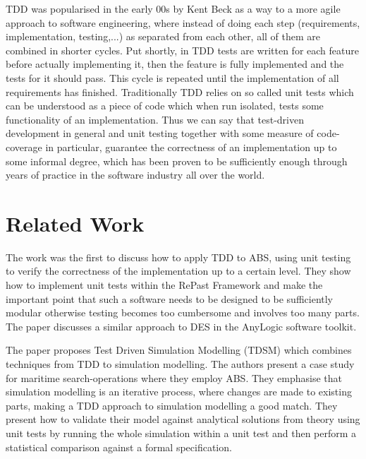 TDD was popularised in the early 00s by Kent Beck \cite{beck_test_2002} as a way to a more agile approach to software engineering, where instead of doing each step (requirements, implementation, testing,...) as separated from each other, all of them are combined in shorter cycles. Put shortly, in TDD tests are written for each feature before actually implementing it, then the feature is fully implemented and the tests for it should pass. This cycle is repeated until the implementation of all requirements has finished. Traditionally TDD relies on so called unit tests which can be understood as a piece of code which when run isolated, tests some functionality of an implementation. Thus we can say that test-driven development in general and unit testing together with some measure of code-coverage in particular, guarantee the correctness of an implementation up to some informal degree, which has been proven to be sufficiently enough through years of practice in the software industry all over the world. 

\medskip

\section*{Related Work}
The work \cite{collier_test-driven_2013} was the first to discuss how to apply TDD to ABS, using unit testing to verify the correctness of the implementation up to a certain level. They show how to implement unit tests within the RePast Framework \cite{north_complex_2013} and make the important point that such a software needs to be designed to be sufficiently modular otherwise testing becomes too cumbersome and involves too many parts. The paper \cite{asta_investigation_2014} discusses a similar approach to DES in the AnyLogic software toolkit. 

The paper \cite{onggo_test-driven_2016} proposes Test Driven Simulation Modelling (TDSM) which combines techniques from TDD to simulation modelling. The authors present a case study for maritime search-operations where they employ ABS. They emphasise that simulation modelling is an iterative process, where changes are made to existing parts, making a TDD approach to simulation modelling a good match. They present how to validate their model against analytical solutions from theory using unit tests by running the whole simulation within a unit test and then perform a statistical comparison against a formal specification. %

